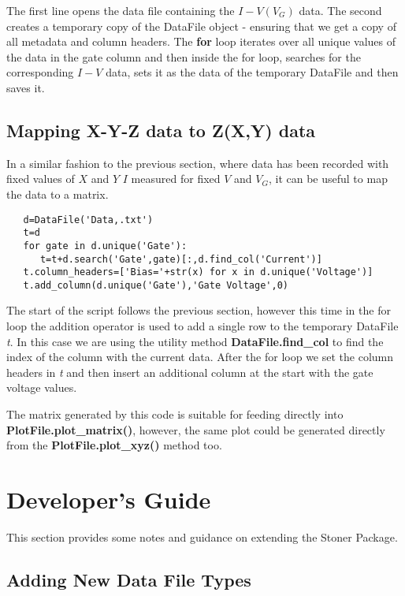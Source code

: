 \documentclass[a4paper,11pt]{scrartcl}
\begin{document}
The first line opens the data file containing the $I-V(V_G)$ data. The second
creates a temporary copy of the DataFile object - ensuring that we get a copy of
all metadata and column headers. The \textbf{for} loop iterates over all unique
values of the data in the gate column and then inside the for loop, searches for
the corresponding $I-V$ data, sets it as the data of the temporary DataFile and
then saves it.

\subsection{Mapping X-Y-Z data to Z(X,Y) data}

In a similar fashion to the previous section, where data has been recorded with
fixed values of $X$ and $Y$ \eg $I$ measured for fixed $V$ and $V_G$, it can be
useful to map the data to a matrix.

\begin{lstlisting}
   d=DataFile('Data,.txt')
   t=d
   for gate in d.unique('Gate'):
      t=t+d.search('Gate',gate)[:,d.find_col('Current')]
   t.column_headers=['Bias='+str(x) for x in d.unique('Voltage')]
   t.add_column(d.unique('Gate'),'Gate Voltage',0)
\end{lstlisting}

The start of the script follows the previous section, however this time in the
for loop the addition operator is used to add a single row to the temporary
DataFile \textit{t}. In this case we are using the utility method
\textbf{DataFile.find\_col} to find the index of the column with the current
data. After the for loop we set the column headers in \textit{t} and then insert
an additional column at the start with the gate voltage values.

The matrix generated by this code is suitable for feeding directly into \textbf{PlotFile.\linebreak plot\_matrix()}, however, the same plot could be generated directly from the \linebreak\textbf{PlotFile.plot\_xyz()} method too.

\section{Developer's Guide}

This section provides some notes and guidance on extending the Stoner Package.

\subsection{Adding New Data File Types}
\end{document}
